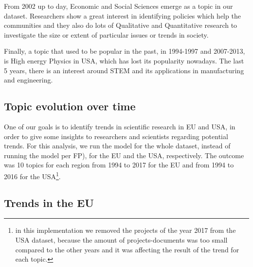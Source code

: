 \documentclass[12pt]{report}
\begin{document}
From 2002 up to day, Economic and Social Sciences emerge as a topic in our
dataset. Researchers show a great interest in identifying policies which help
the communities and they also do lots of Qualitative and Quantitative research
to investigate the size or extent of particular issues or trends in society.

Finally, a topic that used to be popular in the past, in 1994-1997 and
2007-2013, is High energy Physics in USA, which has lost its popularity
nowadays. The last 5 years, there is an interest around STEM and its
applications in manufacturing and engineering.

\subsection{Topic evolution over time}

One of our goals is to identify trends in scientific research in EU
and USA, in order to give some insights to researchers and scientists
regarding potential trends. For this analysis, we run the model for
the whole dataset, instead of running the model per FP), for the EU
and the USA, respectively. The outcome was 10 topics for each region
from 1994 to 2017 for the EU and from 1994 to 2016 for the
USA\footnote{in this implementation we removed the projects of the
  year 2017 from the USA dataset, because the amount of
  projects-documents was too small compared to the other years and it
  was affecting the result of the trend for each topic.}.

\subsection{Trends in the EU}
\end{document}
